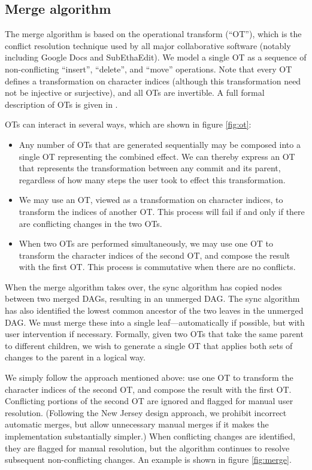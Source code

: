 \documentclass[11pt,titlepage]{article}
\begin{document}
\subsection{Merge algorithm}
\label{sec:merge}

The merge algorithm is based on the operational transform (``OT''),
which is the conflict resolution technique used by all major
collaborative software (notably including Google Docs and
SubEthaEdit).  We model a single OT as a sequence of non-conflicting
``insert'', ``delete'', and ``move'' operations.  Note that every OT
defines a transformation on character indices (although this
transformation need not be injective or surjective), and all OTs are
invertible.  A full formal description of OTs is given in \cite{wave}.

OTs can interact in several ways, which are shown in figure \ref{fig:ot}:
\begin{itemize}
\item Any number of OTs that are generated sequentially may be
  composed into a single OT representing the combined effect.  We can
  thereby express an OT that represents the transformation between any
  commit and its parent, regardless of how many steps the user took to
  effect this transformation.
\item We may use an OT, viewed as a transformation on character
  indices, to transform the indices of another OT.  This process will
  fail if and only if there are conflicting changes in the two OTs.
\item When two OTs are performed simultaneously, we may use one OT to
  transform the character indices of the second OT, and compose the
  result with the first OT.  This process is commutative when there
  are no conflicts.
\end{itemize}

When the merge algorithm takes over, the sync algorithm has copied
nodes between two merged DAGs, resulting in an unmerged DAG.  The sync
algorithm has also identified the lowest common ancestor of the two
leaves in the unmerged DAG.  We must merge these into a single
leaf---automatically if possible, but with user intervention if
necessary. Formally, given two OTs that take the same parent to
different children, we wish to generate a single OT that applies both
sets of changes to the parent in a logical way.

We simply follow the approach mentioned above: use one OT to transform
the character indices of the second OT, and compose the result with
the first OT.  Conflicting portions of the second OT are ignored and
flagged for manual user resolution.  (Following the New Jersey design
approach, we prohibit incorrect automatic merges, but allow
unnecessary manual merges if it makes the implementation substantially
simpler.)  When conflicting changes are identified, they are flagged
for manual resolution, but the algorithm continues to resolve
subsequent non-conflicting changes.  An example is shown in figure
\ref{fig:merge}.
\end{document}
